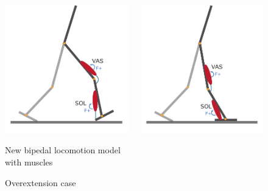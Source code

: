 \documentclass[10pt]{beamer}
\begin{document}
\begin{frame}
\begin{figure}
\begin{overprint}
				\begin{columns}
					\begin{column}{.55\textwidth}
						\centering
						\includegraphics[height=.5\textheight]{images/new_model/stance/muscle_vas_sol.pdf}
						\caption{New bipedal locomotion model with muscles}
					\end{column}
					\begin{column}{.5\textwidth}
						\centering
						\includegraphics[height=.5\textheight]{images/new_model/stance/muscle_vas_sol_overextension.pdf}
						\caption{Overextension case}
					\end{column}  
				\end{columns}
				

\end{overprint}
\end{figure}
\end{frame}
\end{document}
